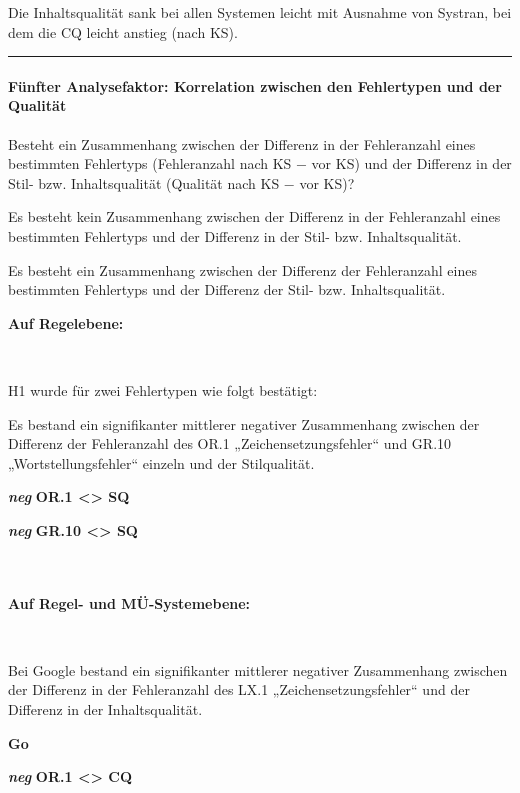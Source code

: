 \medskip
\noindent
\parbox[t]{.8\textwidth}{Die Inhaltsqualität sank bei allen Systemen leicht mit Ausnahme von Systran, bei dem die CQ leicht anstieg (nach KS).}
\parbox[t]{.04\textwidth}{}
\parbox[t]{.15\textwidth}{}
\smallskip
\hrule
\paragraph*{Fünfter Analysefaktor: Korrelation zwischen den Fehlertypen und der Qualität}
\begin{description}[font=\normalfont\bfseries]
\item [Fragestellung:] Besteht ein Zusammenhang zwischen der Differenz in der Fehleranzahl eines bestimmten Fehlertyps (Fehleranzahl nach KS $-$ vor KS) und der Differenz in der Stil- bzw. Inhaltsqualität (Qualität nach KS $-$ vor KS)?
\item [H0 --] Es besteht kein Zusammenhang zwischen der Differenz in der Fehleranzahl eines bestimmten Fehlertyps und der Differenz in der Stil- bzw. Inhaltsqualität.
\item [H1 --] Es besteht ein Zusammenhang zwischen der Differenz der Fehleranzahl eines bestimmten Fehlertyps und der Differenz der Stil- bzw. Inhaltsqualität.
\item [Resultat]
\end{description}
\noindent
\parbox[t]{.7\textwidth}{\textbf{Auf Regelebene:}}\\
\parbox[t]{.7\textwidth}{
H1 wurde für zwei Fehlertypen wie folgt bestätigt:

Es bestand ein signifikanter mittlerer negativer Zusammenhang zwischen der Differenz der Fehleranzahl des OR.1 „Zeichensetzungsfehler“ und GR.10 „Wortstellungsfehler“ einzeln und der Stilqualität.
}
\parbox[t]{.04\textwidth}{}
\colorbox{smGreen}{\parbox[t]{.25\textwidth}{
\textbf{\textit{neg}} \textbf{OR.1 <> SQ}

 \textbf{\textit{neg}} \textbf{GR.10 <> SQ}\\
 \\
 \\
}}

\noindent
\parbox[t]{.7\textwidth}{\textbf{Auf Regel- und MÜ-Systemebene:}}\\
\parbox[t]{.7\textwidth}{
Bei Google bestand ein signifikanter mittlerer negativer Zusammenhang zwischen der Differenz in der Fehleranzahl des LX.1 „Zeichensetzungsfehler“ und der Differenz in der Inhaltsqualität.
}
\parbox[t]{.04\textwidth}{}
\colorbox{smGreen}{\parbox[t]{.25\textwidth}{
{ \textbf{Go}}

 \textbf{\textit{neg}} \textbf{OR.1 <> CQ}\\
 \\
}}

